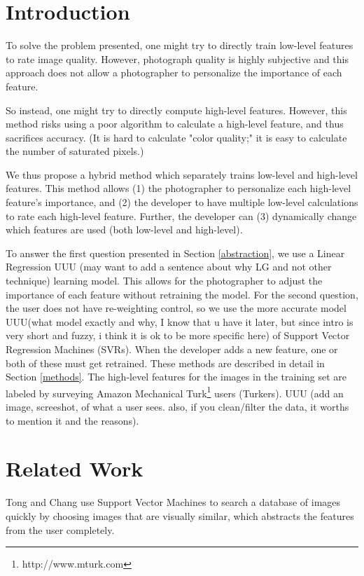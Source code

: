 \documentclass[11pt,letter]{article}
\begin{document}
\section{Introduction}
To solve the problem presented, one might try to directly train low-level features to rate image quality. However, photograph quality is highly subjective and this approach does not allow a photographer to personalize the importance of each feature.

So instead, one might try to directly compute high-level features. However, this method risks using a poor algorithm to calculate a high-level feature, and thus sacrifices accuracy. (It is hard to calculate "color quality;" it is easy to calculate the number of saturated pixels.)

We thus propose a hybrid method which separately trains low-level and high-level features. This method allows (1) the photographer to personalize each high-level feature's importance, and (2) the developer to have multiple low-level calculations to rate each high-level feature. Further, the developer can (3) dynamically change which features are used (both low-level and high-level).

To answer the first question presented in Section \ref{abstraction}, we use a Linear Regression UUU (may want to add a sentence about why LG and not other technique) learning model. This allows for the photographer to adjust the importance of each feature without retraining the model. For the second question, the user does not have re-weighting control, so we use the more accurate model UUU(what model exactly and why, I know that u have it later, but since intro is very short and fuzzy, i think it is ok to be more specific here) of Support Vector Regression Machines (SVRs)\cite{springerlink:10.1023/B:STCO.0000035301.49549.88}. When the developer adds a new feature, one or both of these must get retrained. These methods are described in detail in Section \ref{methods}. The high-level features for the images in the training set are labeled by surveying Amazon Mechanical Turk\footnote{http://www.mturk.com} users (Turkers). UUU (add an image,
screeshot, of what a user sees. also, if you clean/filter the data, it worths to mention it and the reasons).

\section{Related Work}
Tong and Chang\cite{Tong:2001:SVM:500141.500159} use Support Vector Machines to search a database of images quickly by choosing images that are visually similar, which abstracts the features from the user completely.
\end{document}
